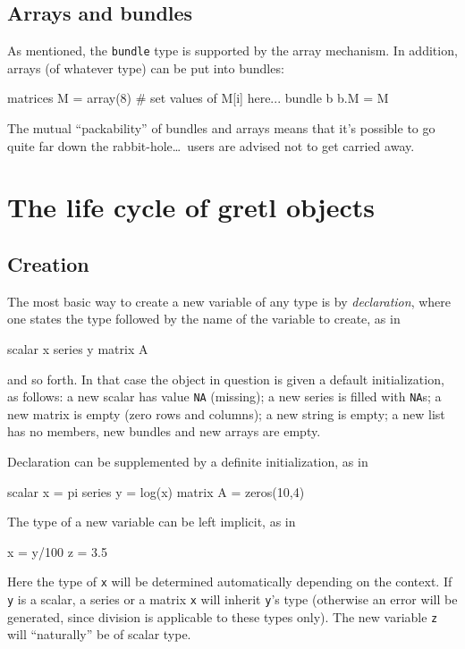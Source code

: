 \subsection{Arrays and bundles}

As mentioned, the \texttt{bundle} type is supported by the array
mechanism. In addition, arrays (of whatever type) can be put into
bundles:
\begin{code}
matrices M = array(8)
# set values of M[i] here...
bundle b
b.M = M
\end{code}

The mutual ``packability'' of bundles and arrays means that it's
possible to go quite far down the rabbit-hole\dots\ users are advised
not to get carried away.

\section{The life cycle of gretl objects}

\subsection{Creation}

The most basic way to create a new variable of any type is by
\textit{declaration}, where one states the type followed by the name
of the variable to create, as in

\begin{code}
scalar x
series y
matrix A
\end{code}

and so forth. In that case the object in question is given a default
initialization, as follows: a new scalar has value \texttt{NA}
(missing); a new series is filled with \texttt{NA}s; a new matrix is
empty (zero rows and columns); a new string is empty; a new list has no
members, new bundles and new arrays are empty.

Declaration can be supplemented by a definite initialization, as in

\begin{code}
scalar x = pi
series y = log(x)
matrix A = zeros(10,4)
\end{code}

The type of a new variable can be left implicit, as in
\begin{code}
x = y/100
z = 3.5
\end{code}
Here the type of \texttt{x} will be determined automatically depending
on the context.  If \texttt{y} is a scalar, a series or a matrix
\texttt{x} will inherit \texttt{y}'s type (otherwise an error will be
generated, since division is applicable to these types only). The new
variable \texttt{z} will ``naturally'' be of scalar type.

